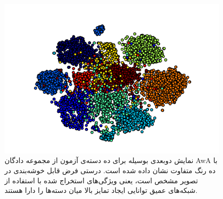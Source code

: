 \begin{figure}[th]
\centering
\includegraphics[width=0.85\linewidth]{images/awa_clusters}
\caption[نمایش دسته‌های آزمون مجموعه دادگان AwA ]{
نمایش دوبعدی بوسیله  برای ده دسته‌ی آزمون از مجموعه دادگان AwA با ده رنگ متفاوت نشان داده شده است. درستی فرض قابل خوشه‌بندی در تصویر مشخص است، یعنی ویژگی‌های استخراج شده با استفاده از شبکه‌های عمیق توانایی ایجاد تمایز بالا میان دسته‌ها را دارا هستند.
}
\label{fig:awa_clusters}
\end{figure}

